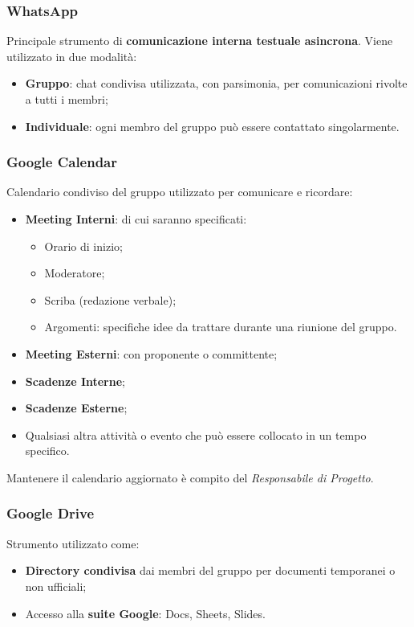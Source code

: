 \subsubsection{WhatsApp}
Principale strumento di \textbf{comunicazione interna testuale asincrona}. Viene utilizzato in due modalità:
\begin{itemize}
  \item \textbf{Gruppo}: chat condivisa utilizzata, con parsimonia, per comunicazioni rivolte a tutti i membri;
  \item \textbf{Individuale}: ogni membro del gruppo può essere contattato singolarmente.
\end{itemize}

\subsubsection{Google Calendar}
Calendario condiviso del gruppo utilizzato per comunicare e ricordare:
\begin{itemize}
  \item \textbf{Meeting Interni}: di cui saranno specificati:
  \begin{itemize}
    \item Orario di inizio;
    \item Moderatore;
    \item Scriba (redazione verbale);
    \item Argomenti: specifiche idee da trattare durante una riunione del gruppo.
  \end{itemize}
  \item \textbf{Meeting Esterni}: con proponente o committente;
  \item \textbf{Scadenze Interne};
  \item \textbf{Scadenze Esterne};
  \item Qualsiasi altra attività o evento che può essere collocato in un tempo specifico.
\end{itemize}
Mantenere il calendario aggiornato è compito del \textit{Responsabile di Progetto}.

\subsubsection{Google Drive}
Strumento utilizzato come:
\begin{itemize}
  \item \textbf{Directory condivisa} dai membri del gruppo per documenti temporanei o non ufficiali;
  \item Accesso alla \textbf{suite Google}: Docs, Sheets, Slides.
\end{itemize}

